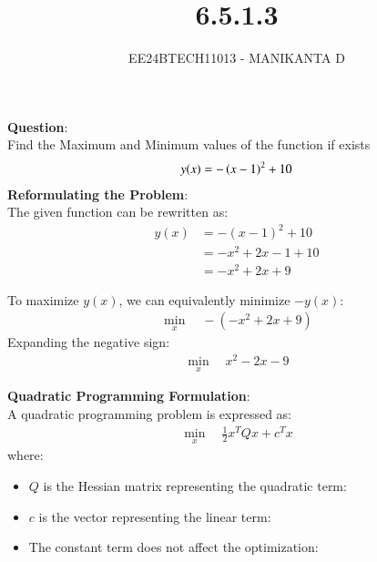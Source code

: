 \documentclass[journal]{IEEEtran}
\begin{document}

\vspace{3cm}

\title{6.5.1.3}
\author{EE24BTECH11013 - MANIKANTA D}
{\let\newpage\relax\maketitle}

\renewcommand{\thefigure}{\theenumi}
\renewcommand{\thetable}{\theenumi}
\setlength{\intextsep}{10pt} %

\renewcommand{\thetable}{\theenumi}
\textbf{Question}:\\
Find the Maximum and Minimum values of the function if exists \\
 \begin{align*}
     y (x) = -\left(x-1\right)^2+10
 \end{align*}  
\textbf{Reformulating the Problem}:\\
The given function can be rewritten as: 
\begin{align}
y(x) &= -(x - 1)^2 + 10 \\
     &= -x^2 + 2x - 1 + 10 \\
     &= -x^2 + 2x + 9
\end{align}

To maximize $y(x)$, we can equivalently minimize $-y(x)$:\\
\begin{align}
\min_{x} \quad -(-x^2 + 2x + 9)
\end{align}
Expanding the negative sign: 
\begin{align}
\min_{x} \quad x^2 - 2x - 9
\end{align}

\textbf{Quadratic Programming Formulation}:\\
A quadratic programming problem is expressed as: 
\begin{align}
\min_{x} \quad \frac{1}{2} x^T Q x + c^T x
\end{align}
where: 
\begin{itemize}
    \item $Q$ is the Hessian matrix representing the quadratic term:\\
    \item $c$ is the vector representing the linear term:\\
    \item The constant term does not affect the optimization:\\
\end{itemize}
\end{document}
